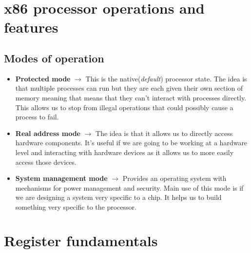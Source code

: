 \documentclass{article}
\makeatletter
\renewcommand\paragraph{\@startsection{paragraph}{4}{\z@}{-3.25ex \@plus -1ex \@minus -.2ex}{1.5ex \@plus .2ex}{\normalfont\normalsize\bfseries}}
\makeatother
\begin{document}
\section{x86 processor operations and features}

\subsection{Modes of operation}
\paragraph{}
\begin{itemize}
\item \textbf{Protected mode} $\rightarrow$ This is the native(\textit{default}) processor state. The idea is that multiple processes can run but they are each given their own section of memory meaning that means that they can't interact with processes directly. This allows us to stop from illegal operations that could possibly cause a process to fail.
\item \textbf{Real address mode} $\rightarrow$ The idea is that it allows us to directly access hardware components. It's useful if we are going to be working at a hardware level and interacting with hardware devices as it allows us to more easily access those devices.
\item \textbf{System management mode} $\rightarrow$ Provides an operating system with mechanisms for power management and security. Main use of this mode is if we are designing a system very specific to a chip. It helps us to build something very specific to the processor.
\end{itemize}

\newpage
\section{Register fundamentals}
\end{document}

